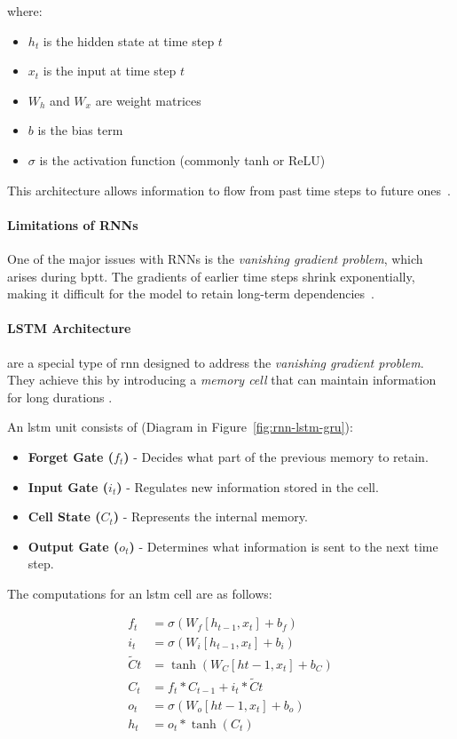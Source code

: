 where:
\begin{itemize}
    \item $h_t$ is the hidden state at time step $t$
    \item $x_t$ is the input at time step $t$
    \item $W_h$ and $W_x$ are weight matrices
    \item $b$ is the bias term
    \item $\sigma$ is the activation function (commonly tanh or ReLU)
\end{itemize}

This architecture allows information to flow from past time steps to future ones~\parencite{nabipour2020DeepLearning}.

\paragraph{Limitations of RNNs}
One of the major issues with RNNs is the \emph{vanishing gradient problem}, which arises during \acrfull{bptt}. 
The gradients of earlier time steps shrink exponentially, making it difficult for the model to retain long-term 
dependencies~\parencite{parmar2018stock}.

\paragraph{LSTM Architecture}  are a special type of \acrshort{rnn} designed to address the 
\emph{vanishing gradient problem}. They achieve this by introducing a \emph{memory cell} that can maintain 
information for long durations \parencite{phuoc2024StockPrediction}.

An \acrshort{lstm} unit consists of (Diagram in Figure~\ref{fig:rnn-lstm-gru}):
\begin{itemize}
\item \textbf{Forget Gate ($f_t$)} - Decides what part of the previous memory to retain.
\item \textbf{Input Gate ($i_t$)} - Regulates new information stored in the cell.
\item \textbf{Cell State ($C_t$)} - Represents the internal memory.
\item \textbf{Output Gate ($o_t$)} - Determines what information is sent to the next time step.
\end{itemize}

The computations for an \acrshort{lstm} cell are as follows:

\begin{align}
f_t &= \sigma(W_f [h_{t-1}, x_t] + b_f) \\
i_t &= \sigma(W_i [h_{t-1}, x_t] + b_i) \\
\tilde{C}t &= \tanh(W_C [h{t-1}, x_t] + b_C) \\
C_t &= f_t * C_{t-1} + i_t * \tilde{C}t \\
o_t &= \sigma(W_o [h{t-1}, x_t] + b_o) \\
h_t &= o_t * \tanh(C_t)
\end{align}

